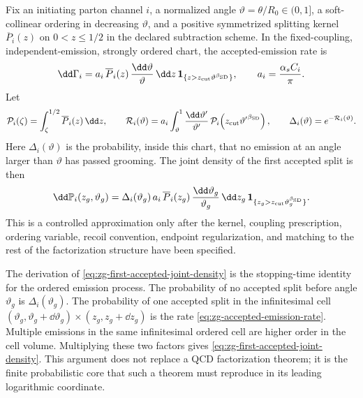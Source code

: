 \begin{controlledapproximation}
\label{ca:sudakov-conditioned-zg}
Fix an initiating parton channel \(i\), a normalized angle
\(\vartheta=\theta/R_0\in(0,1]\), a soft-collinear ordering in decreasing
\(\vartheta\), and a positive symmetrized splitting kernel
\(\overline P_i(z)\) on \(0<z\leq1/2\) in the declared subtraction scheme.
In the fixed-coupling, independent-emission, strongly ordered chart, the
accepted-emission rate is
\begin{equation}
  \dd\Gamma_i
  =
  a_i\,\overline P_i(z)\,
  \frac{\dd\vartheta}{\vartheta}\,\dd z\,
  \mathbf 1_{\{z>z_{\rm cut}\vartheta^{\beta_{\rm SD}}\}},
  \qquad
  a_i=\frac{\alpha_s C_i}{\pi}.
  \label{eq:zg-accepted-emission-rate}
\end{equation}
Let
\begin{equation}
  \mathcal P_i(\zeta)
  =
  \int_{\zeta}^{1/2}\overline P_i(z)\,\dd z,
  \qquad
  \mathcal R_i(\vartheta)
  =
  a_i\int_{\vartheta}^{1}
  \frac{\dd\vartheta'}{\vartheta'}\,
  \mathcal P_i\!\left(z_{\rm cut}{\vartheta'}^{\beta_{\rm SD}}\right),
  \qquad
  \Delta_i(\vartheta)=e^{-\mathcal R_i(\vartheta)} .
  \label{eq:zg-sudakov-factor}
\end{equation}
Here \(\Delta_i(\vartheta)\) is the probability, inside this chart, that no
emission at an angle larger than \(\vartheta\) has passed grooming.  The joint
density of the first accepted split is then
\begin{equation}
  \dd\mathbb P_i(z_g,\vartheta_g)
  =
  \Delta_i(\vartheta_g)\,
  a_i\,\overline P_i(z_g)\,
  \frac{\dd\vartheta_g}{\vartheta_g}\,\dd z_g\,
  \mathbf 1_{\{z_g>z_{\rm cut}\vartheta_g^{\beta_{\rm SD}}\}} .
  \label{eq:zg-first-accepted-joint-density}
\end{equation}
This is a controlled approximation only after the kernel, coupling
prescription, ordering variable, recoil convention, endpoint regularization,
and matching to the rest of the factorization structure have been specified.
\end{controlledapproximation}

The derivation of
\eqref{eq:zg-first-accepted-joint-density} is the stopping-time identity for
the ordered emission process.  The probability of no accepted split before
angle \(\vartheta_g\) is \(\Delta_i(\vartheta_g)\).  The probability of one
accepted split in the infinitesimal cell
\((\vartheta_g,\vartheta_g+\dd\vartheta_g)\times
(z_g,z_g+\dd z_g)\) is the rate
\eqref{eq:zg-accepted-emission-rate}.  Multiple emissions in the same
infinitesimal ordered cell are higher order in the cell volume.  Multiplying
these two factors gives
\eqref{eq:zg-first-accepted-joint-density}.  This argument does not replace a
QCD factorization theorem; it is the finite probabilistic core that such a
theorem must reproduce in its leading logarithmic coordinate.

